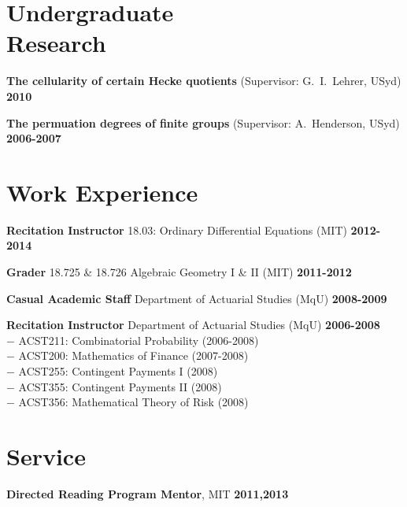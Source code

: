 \documentclass[margin,line]{resume}
\newcommand{\award}[3]{\textbf{#1} #2 \hfill \textbf{#3}
           
\vspace{-2.3mm}}
\newcommand{\twolineaward}[4]{\textbf{#1} #2 \hfill \textbf{#4}\\%
#3
           
\vspace{-2.3mm}}
\begin{document}
\begin{resume}
\vspace{2.3mm}

          \section{\mysidestyle Undergraduate \\ Research}


\noindent \textbf{The cellularity of certain Hecke quotients} (Supervisor: G.\ I.\ Lehrer, USyd) 
\hfill \textbf{2010}

 \vspace{-2mm}
\noindent \textbf{The permuation degrees of finite groups} (Supervisor: A.\ Henderson, USyd) 
\hfill \textbf{2006-2007}      
      
         \section{\mysidestyle Work Experience}
\award{Recitation Instructor}{18.03: Ordinary Differential Equations (MIT)}{2012-2014}
\award{Grader}{18.725 \& 18.726 Algebraic Geometry I \& II (MIT)}{2011-2012}

\award{Casual Academic Staff}{Department of Actuarial Studies (MqU)}{2008-2009}
\twolineaward{Recitation Instructor}{Department of Actuarial Studies (MqU)}{%
\phantom{space}$-$ ACST211: Combinatorial Probability (2006-2008)\\
\phantom{space}$-$ ACST200: Mathematics of Finance (2007-2008)\\
\phantom{space}$-$ ACST255: Contingent Payments I (2008)\\
\phantom{space}$-$ ACST355: Contingent Payments II (2008)\\
\phantom{space}$-$ ACST356: Mathematical Theory of Risk (2008)%
}{2006-2008}


\vspace{2mm}


   \section{\mysidestyle Service}

    \textbf{Directed Reading Program Mentor}, {MIT} \hfill \textbf{2011,2013}

\vspace{-2mm}


\end{resume}
\end{document}
